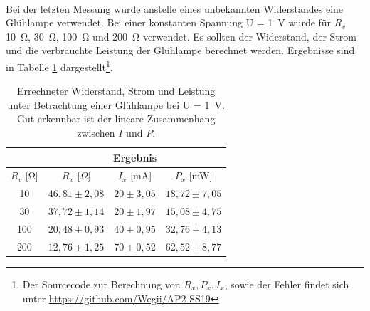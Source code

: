 \documentclass[a4paper,usenatbib]{aspdoc}
\begin{document}
            \\
            Bei der letzten Messung wurde anstelle eines unbekannten Widerstandes eine Glühlampe verwendet. Bei einer konstanten Spannung U = \SI{1}{\volt} wurde für $R_v$ \SI{10}{\ohm}, \SI{30}{\ohm}, \SI{100}{\ohm} und \SI{200}{\ohm} verwendet. Es sollten der Widerstand, der Strom und die verbrauchte Leistung der Glühlampe berechnet werden. Ergebnisse sind in Tabelle \ref{tab:gluh} dargestellt\footnote{Der Sourcecode zur Berechnung von $R_x, P_x, I_x$, sowie der Fehler findet sich unter \url{https://github.com/Wegii/AP2-SS19}\label{note:source}}.

            \begin{table}
                \centering
                \begin{tabular}{c|ccc}
                    \multicolumn{1}{c}{} & \multicolumn{3}{c}{Ergebnis} \\
                    \cmidrule(lr){2-4}
                    \toprule
                     $R_v$ [\si{\ohm}]& $R_x$ [$\Omega$]    & $I_x$ [mA]   & $P_x$ [mW] \\ 
                        10  & $46,81 \pm 2,08$      & $20 \pm 3,05$        & $18,72 \pm 7,05$    \\ 
                        30   & $37,72 \pm 1,14$     & $20 \pm 1,97$        & $15,08 \pm 4,75$    \\ 
                        100   & $20,48 \pm 0,93$    & $40 \pm 0,95$        & $32,76 \pm 4,13$    \\ 
                        200   & $12,76 \pm 1,25$    & $70 \pm 0,52$   & $62,52 \pm 8,77 $   \\
                    \bottomrule
                \end{tabular}
                \caption{Errechneter Widerstand, Strom und Leistung unter Betrachtung einer Glühlampe bei U = \SI{1}{V}. Gut erkennbar ist der lineare Zusammenhang zwischen $I$ und $P$.}
                \label{tab:gluh}
            \end{table}
\end{document}
